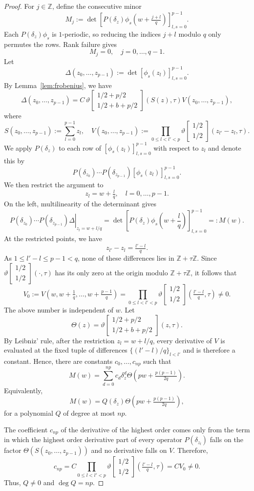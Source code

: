 \documentclass[reqno,a4paper,12pt]{amsart}
\numberwithin{equation}{section}
\newcommand{\Z}{\mathbb Z}
\newcommand{\dd}{\delta}
\newcommand{\thetac}[2]{{\vartheta\left[\begin{smallmatrix}
        #1 \\ #2
    \end{smallmatrix}\right]}}
\begin{document}
\begin{proof}
For $j\in\Z$, define the consecutive minor
$$
M_j:=
\det\left[
{P(\dd_z)}\phi_s\left(w+\tfrac{j+l}{q}\right)
\right]_{l,s=0}^{p-1}.
$$
Each $P(\dd_z)\phi_s$ is $1$-periodic, so reducing the indices
$j+l$ modulo $q$ only permutes the rows. 
Rank failure gives
$$
M_j=0,
\quad j=0,\dots,q-1.
$$
Let
$$
\Delta(z_0,\dots,z_{p-1})
:=
\det[\phi_s(z_l)]_{l,s=0}^{p-1}.
$$
By Lemma~\ref{lem:frobenius}, we have
$$
\Delta(z_0,\dots,z_{p-1})
=
C\, \thetac{1/2+p/2}{1/2+b+p/2}(S(z), \tau)V(z_0,\dots,z_{p-1}) ,
$$
where
$$
S(z_0,\dots,z_{p-1}):=\sum_{l=0}^{p-1} z_l,
\quad
V(z_0,\dots,z_{p-1})
:=\prod\limits_{0\leq l<l'< p}\thetac{1/2}{1/2}(z_{l'}-z_l,\tau).
$$
We apply $P(\dd_z)$ to each row of $[\phi_s(z_l)]_{l,s=0}^{p-1}$ with respect to $z_l$ and denote this by 
$$
P(\dd_{z_0})\cdots P(\dd_{z_{p-1}}) [\phi_s(z_l)]_{l,s=0}^{p-1}.
$$
We then restrict the argument to 
$$
z_l=w+\tfrac{l}{q},
\quad l=0,\dots,p-1.
$$
On the left, multilinearity of the determinant gives
$$
\left.
P(\dd_{z_0})\cdots P(\dd_{z_{p-1}})\Delta
\right|_{z_l=w+l/q}
=
\det\left[
P(\dd_z)\phi_s\left(w+\frac{l}{q}\right)
\right]_{l,s=0}^{p-1}
=:M(w).
$$
At the restricted points, we have
$$
z_{l'}-z_l=\tfrac{l'-l}{q}.
$$
As $1\leq l'-l\leq p-1<q$, none of these differences lies in
$\Z+\tau\Z$.  Since $\thetac{1/2}{1/2}(\cdot,\tau)$ has its only zero at the
origin modulo $\Z+\tau\Z$, it follows that
$$
V_0:=
V\left(w,w+\tfrac1q,\dots,w+\tfrac{p-1}{q}\right)
=
\prod\limits_{0\leq l <l'< p}\thetac{1/2}{1/2}(\tfrac{l'-l}{q},\tau)
\neq0.
$$
The above number is independent of $w$.
Let 
\begin{equation}
    \Theta(z)=\thetac{1/2+p/2}{1/2+b+p/2}(z,\tau).
\end{equation}
By Leibniz' rule, after the restriction $z_l=w+l/q$, every derivative of
$V$ is evaluated at the fixed tuple of differences
$\{(l'-l)/q\}_{l<l'}$ and is therefore a constant.  Hence, there are
constants $c_0,\dots,c_{np}$ such that
$$
M(w)
=
\sum_{d=0}^{np}c_d
\dd_z^d\Theta \left(pw+\tfrac{p(p-1)}{2q}\right).
$$
Equivalently,
$$
M(w)=Q(\dd_z)\Theta \left(pw+\tfrac{p(p-1)}{2q}\right),
$$
for a polynomial $Q$ of degree at most $np$.

The coefficient $c_{np}$ of the derivative of the highest order  comes only from the term in which the highest order
derivative part of every operator $P(\dd_{z_l})$
falls on the factor $\Theta(S(z_0,\dots,z_{p-1}))$ and no derivative falls on $V$. Therefore,
$$
c_{np}
=
C\prod_{0\leq l<l'< p}
\thetac{1/2}{1/2}\left(\tfrac{l'-l}{q},\tau\right)
=
CV_0
\neq0.
$$
Thus, $Q\neq0$ and $\deg Q={{n}}p$.


\end{proof}
\end{document}
